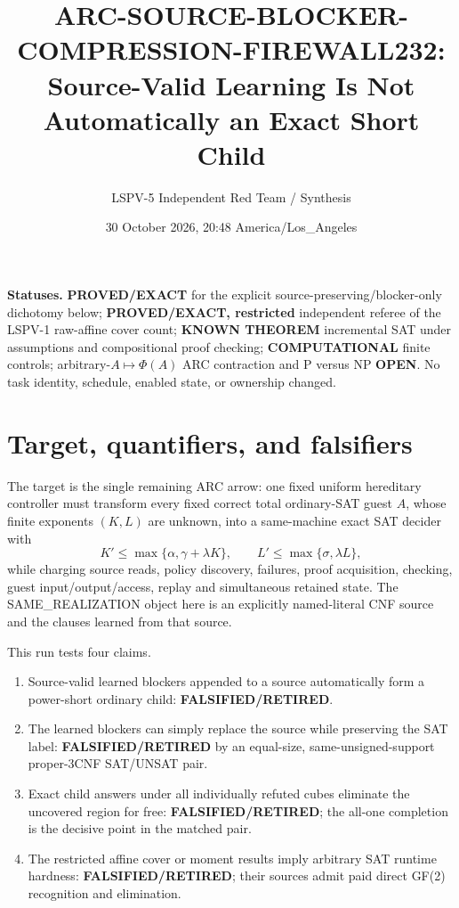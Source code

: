 \documentclass[11pt]{article}
\title{ARC-SOURCE-BLOCKER-COMPRESSION-FIREWALL232:\\
Source-Valid Learning Is Not Automatically an Exact Short Child}
\author{LSPV-5 Independent Red Team / Synthesis}
\date{30 October 2026, 20:48 America/Los\_Angeles}
\begin{document}
\maketitle

\noindent\textbf{Statuses.}
\textbf{PROVED/EXACT} for the explicit source-preserving/blocker-only
dichotomy below; \textbf{PROVED/EXACT, restricted} independent referee of the
LSPV-1 raw-affine cover count; \textbf{KNOWN THEOREM} incremental SAT under
assumptions and compositional proof checking; \textbf{COMPUTATIONAL} finite
controls; arbitrary-$A\mapsto\Phi(A)$ ARC contraction and P versus NP
\textbf{OPEN}.  No task identity, schedule, enabled state, or ownership changed.

\section{Target, quantifiers, and falsifiers}
The target is the single remaining ARC arrow: one fixed uniform hereditary
controller must transform every fixed correct total ordinary-SAT guest $A$,
whose finite exponents $(K,L)$ are unknown, into a same-machine exact SAT
decider with
\[
 K'\le\max\{\alpha,\gamma+\lambda K\},\qquad
 L'\le\max\{\sigma,\lambda L\},
\]
while charging source reads, policy discovery, failures, proof acquisition,
checking, guest input/output/access, replay and simultaneous retained state.
The SAME\_REALIZATION object here is an explicitly named-literal CNF source
and the clauses learned from that source.

This run tests four claims.
\begin{enumerate}
\item Source-valid learned blockers appended to a source automatically form a
power-short ordinary child: \textbf{FALSIFIED/RETIRED}.
\item The learned blockers can simply replace the source while preserving the
SAT label: \textbf{FALSIFIED/RETIRED} by an equal-size, same-unsigned-support
proper-3CNF SAT/UNSAT pair.
\item Exact child answers under all individually refuted cubes eliminate the
uncovered region for free: \textbf{FALSIFIED/RETIRED}; the all-one completion
is the decisive point in the matched pair.
\item The restricted affine cover or moment results imply arbitrary SAT
runtime hardness: \textbf{FALSIFIED/RETIRED}; their sources admit paid direct
GF(2) recognition and elimination.
\end{enumerate}
\end{document}
